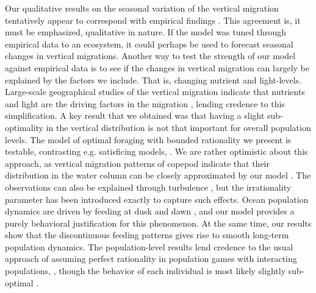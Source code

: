 


Our qualitative results on the seasonal variation of the vertical migration tentatively appear to correspond with empirical findings \citep{wang2014seasonal, beaugrand2001geographical, colebrook1979continuous}. This agreement is, it must be emphasized, qualitative in nature. If the model was tuned through empirical data to an ecosystem, it could perhaps be used to forecast seasonal changes in vertical migrations. Another way to test the strength of our model against empirical data is to see if the changes in vertical migration can largely be explained by the factors we include. That is, changing nutrient and light-levels. Large-scale geographical studies of the vertical migration indicate that nutrients and light are the driving factors in the migration \citep{klevjer2016large}, lending credence to this simplification. A key result that we obtained was that having a slight sub-optimality in the vertical distribution is not that important for overall population levels. The model of optimal foraging with bounded rationality we present is testable, contrasting e.g. satisficing models, \citep{nonacs1993satisficing}. We are rather optimistic about this approach, as vertical migration patterns of copepod indicate that their distribution in the water column can be closely approximated by our model \citep{hay1991zooplankton, visser2001observations}. The observations can also be explained through turbulence \citep{visser2001observations}, but the irrationality parameter has been introduced exactly to capture such effects. Ocean population dynamics are driven by feeding at dusk and dawn \citep{benoit2014critical}, and our model provides a purely behavioral justification for this phenomenon. At the same time, our results show that the discontinuous feeding patterns gives rise to smooth long-term population dynamics.  The population-level results lend credence to the usual approach of assuming perfect rationality in population games with interacting populations, \citep{kvrivan2008ideal}, though the behavior of each individual is most likely slightly sub-optimal
\citep{hurly1999context}.

